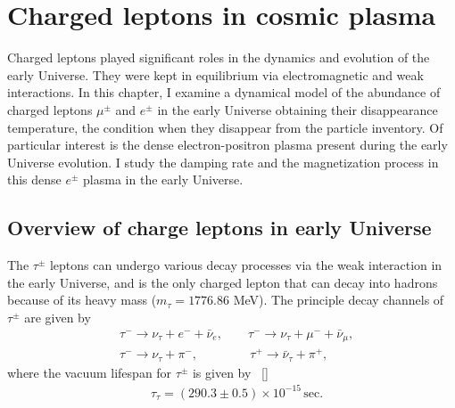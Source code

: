 \section{Charged leptons in cosmic plasma}\label{Electron}

Charged leptons played significant roles in the dynamics and evolution of the early Universe. They were kept in equilibrium via electromagnetic and weak interactions.  In this chapter, I examine a dynamical model of the abundance of charged leptons $\mu^\pm$ and $e^\pm$ in the early Universe obtaining their disappearance temperature, the condition when they disappear from the particle inventory. Of particular interest is the dense electron-positron plasma present during the early Universe evolution. I study the damping rate and the magnetization process in this dense $e^\pm$ plasma in the early Universe.



\subsection{Overview of charge leptons in early Universe}





The $\tau^\pm$ leptons can undergo various decay processes via the weak interaction in the early Universe, and is the only charged lepton that can decay into hadrons because of its heavy mass ($m_\tau=1776.86$ MeV). The principle decay channels of $\tau^\pm$ are given by
\begin{align}
&\tau^-\rightarrow\nu_\tau+e^-+\bar{\nu}_e,\qquad \tau^-\rightarrow\nu_\tau+\mu^-+\bar{\nu}_\mu,\\
&\tau^-\rightarrow\nu_\tau+\pi^-,\qquad\qquad\,\tau^+\rightarrow\bar{\nu}_\tau+\pi^+,
\end{align}
 where the vacuum lifespan for $\tau^\pm$ is given by ~[\cite{ParticleDataGroup:2022pth}]
\begin{align}
&\tau_{\tau}=(290.3\pm0.5)\times10^{-15}\,\mathrm{sec}.
\end{align}

